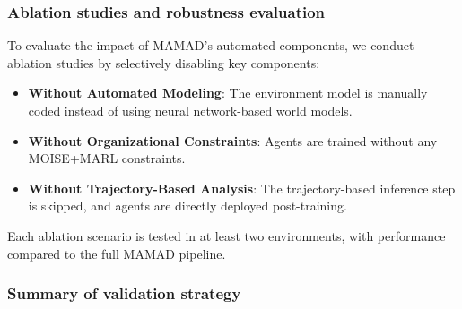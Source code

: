 \documentclass[pdflatex,sn-mathphys-num]{sn-jnl}%
\theoremstyle{thmstyleone}%
\theoremstyle{thmstyletwo}%
\theoremstyle{thmstylethree}%
\begin{document}
\subsubsection{Ablation studies and robustness evaluation}
To evaluate the impact of MAMAD's automated components, we conduct ablation studies by selectively disabling key components:
\begin{itemize}
    \item \textbf{Without Automated Modeling}: The environment model is manually coded instead of using neural network-based world models.
    \item \textbf{Without Organizational Constraints}: Agents are trained without any MOISE+MARL constraints.
    \item \textbf{Without Trajectory-Based Analysis}: The trajectory-based inference step is skipped, and agents are directly deployed post-training.
\end{itemize}

Each ablation scenario is tested in at least two environments, with performance compared to the full MAMAD pipeline.


\subsubsection{Summary of validation strategy}
\end{document}
